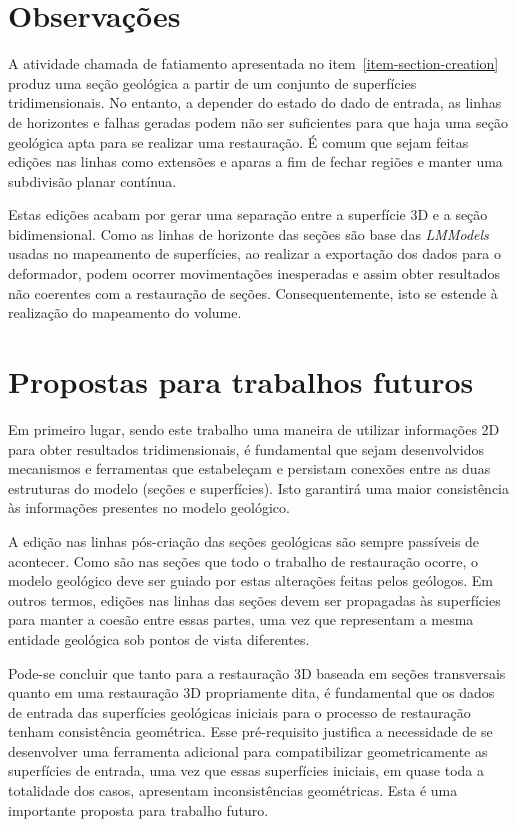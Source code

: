 \section{Observações}

A atividade chamada de fatiamento apresentada no item~\ref{item-section-creation} produz uma seção geológica a partir de um conjunto de superfícies tridimensionais. No entanto, a depender do estado do dado de entrada, as linhas de horizontes e falhas geradas podem não ser suficientes para que haja uma seção geológica apta para se realizar uma restauração. É comum que sejam feitas edições nas linhas como extensões e aparas a fim de fechar regiões e manter uma subdivisão planar contínua.

Estas edições acabam por gerar uma separação entre a superfície 3D e a seção bidimensional. Como as linhas de horizonte das seções são base das \emph{LMModels} usadas no mapeamento de superfícies, ao realizar a exportação dos dados para o deformador, podem ocorrer movimentações inesperadas e assim obter resultados não coerentes com a restauração de seções. Consequentemente, isto se estende à realização do mapeamento do volume.

\section{Propostas para trabalhos futuros}

Em primeiro lugar, sendo este trabalho uma maneira de utilizar informações 2D para obter resultados tridimensionais, é fundamental que sejam desenvolvidos mecanismos e ferramentas que estabeleçam e persistam conexões entre as duas estruturas do modelo (seções e superfícies). Isto garantirá uma maior consistência às informações presentes no modelo geológico.

A edição nas linhas pós-criação das seções geológicas são sempre passíveis de acontecer. Como são nas seções que todo o trabalho de restauração ocorre, o modelo geológico deve ser guiado por estas alterações feitas pelos geólogos. Em outros termos, edições nas linhas das seções devem ser propagadas às superfícies para manter a coesão entre essas partes, uma vez que representam a mesma entidade geológica sob pontos de vista diferentes.

Pode-se concluir que tanto para a restauração 3D baseada em seções transversais quanto em uma restauração 3D propriamente dita, é fundamental que os dados de entrada das superfícies geológicas iniciais para o processo de restauração tenham consistência geométrica. Esse pré-requisito justifica a necessidade de se desenvolver uma ferramenta adicional para compatibilizar geometricamente as superfícies de entrada, uma vez que essas superfícies iniciais, em quase toda a totalidade dos casos, apresentam inconsistências geométricas. Esta é uma importante proposta para trabalho futuro.


